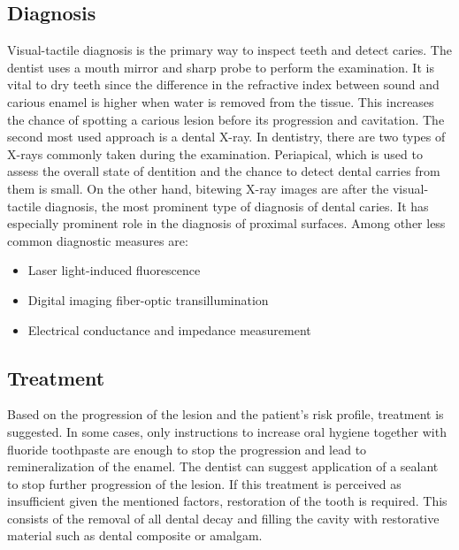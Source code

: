 \subsection{Diagnosis}
Visual-tactile diagnosis is the primary way to inspect teeth and detect caries. The dentist uses a mouth mirror and sharp probe to perform the examination. It is vital to dry teeth since the difference in the refractive index between sound and carious enamel is higher when water is removed from the tissue. This increases the chance of spotting a carious lesion before its progression and cavitation.
The second most used approach is a dental X-ray. In dentistry, there are two types of X-rays commonly taken during the examination. Periapical, which is used to assess the overall state of dentition and the chance to detect dental carries from them is small. On the other hand, bitewing X-ray images are after the visual-tactile diagnosis, the most prominent type of diagnosis of dental caries. It has especially prominent role in the diagnosis of proximal surfaces. \newline
Among other less common diagnostic measures are:
\begin{itemize}
    \item Laser light-induced fluorescence
    \item Digital imaging fiber-optic transillumination
    \item Electrical conductance and impedance measurement
\end{itemize}

\subsection{Treatment}
Based on the progression of the lesion and the patient's risk profile, treatment is suggested. In some cases, only instructions to increase oral hygiene together with fluoride toothpaste are enough to stop the progression and lead to remineralization of the enamel. The dentist can suggest application of a sealant to stop further progression of the lesion. If this treatment is perceived as insufficient given the mentioned factors, restoration of the tooth is required. This consists of the removal of all dental decay and filling the cavity with restorative material such as dental composite or amalgam.

